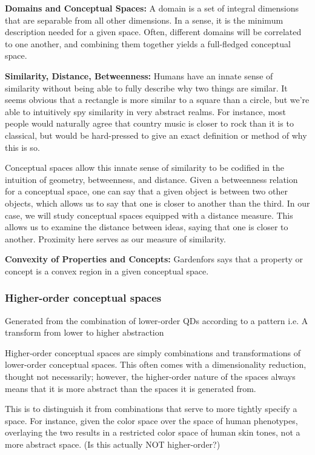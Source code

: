 \documentclass{article}
\begin{document}
\textbf{Domains and Conceptual Spaces:}
A domain is a set of integral dimensions that are separable from all other dimensions.  In a sense, it is the minimum description needed for a given space.  Often, different domains will be correlated to one another, and combining them together yields a full-fledged conceptual space.

\textbf{Similarity, Distance, Betweenness:}
Humans have an innate sense of similarity without being able to fully describe why two things are similar.  It seems obvious that a rectangle is more similar to a square than a circle, but we're able to intuitively spy similarity in very abstract realms.  For instance, most people would naturally agree that country music is closer to rock than it is to classical, but would be hard-pressed to give an exact definition or method of why this is so.

Conceptual spaces allow this innate sense of similarity to be codified in the intuition of geometry, betweenness, and distance.  Given a betweenness relation for a conceptual space, one can say that a given object is between two other objects, which allows us to say that one is closer to another than the third.  In our case, we will study conceptual spaces equipped with a distance measure.  This allows us to examine the distance between ideas, saying that one is closer to another.  Proximity here serves as our measure of similarity.

\textbf{Convexity of Properties and Concepts:}
Gardenfors says that a property or concept is a convex region in a given conceptual space.

\subsubsection{Higher-order conceptual spaces}
Generated from the combination of lower-order QDs according to a pattern
i.e. A transform from lower to higher abstraction

Higher-order conceptual spaces are simply combinations and transformations of lower-order conceptual spaces.  This often comes with a dimensionality reduction, thought not necessarily; however, the higher-order nature of the spaces always means that it is more abstract than the spaces it is generated from.

This is to distinguish it from combinations that serve to more tightly specify a space.  For instance, given the color space over the space of human phenotypes, overlaying the two results in a restricted color space of human skin tones, not a more abstract space.  (Is this actually NOT higher-order?)  
\end{document}
